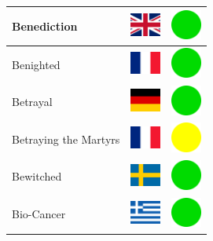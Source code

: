 \documentclass[12pt, a4paper, twoside]{report}
\begin{document}
\begin{center}
\begin{longtable}{|p{5cm}|p{2cm}|p{2cm}|}
 Benediction                                                & \includegraphics[width=1cm]{../img/flags/gb} &   \includegraphics[width=1cm]{../likes/y} \\ \hline
 Benighted                                                  & \includegraphics[width=1cm]{../img/flags/fr} &   \includegraphics[width=1cm]{../likes/y} \\ \hline
 Betrayal                                                   & \includegraphics[width=1cm]{../img/flags/de} &   \includegraphics[width=1cm]{../likes/y} \\ \hline
 Betraying the Martyrs                                      & \includegraphics[width=1cm]{../img/flags/fr} &   \includegraphics[width=1cm]{../likes/m} \\ \hline
 Bewitched                                                  & \includegraphics[width=1cm]{../img/flags/se} &   \includegraphics[width=1cm]{../likes/y} \\ \hline
 Bio-Cancer                                                 & \includegraphics[width=1cm]{../img/flags/gr} &   \includegraphics[width=1cm]{../likes/y} \\ \hline

\end{longtable}
\end{center}
\end{document}
